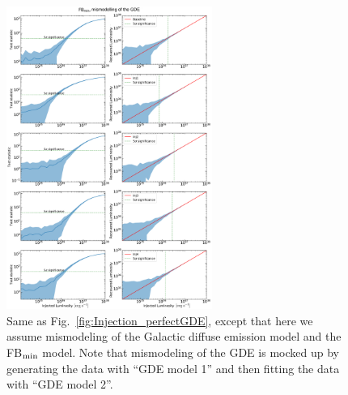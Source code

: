 \documentclass[doublespace,nopageskip]{VTthesis}
\begin{document}
\begin{figure}
    \begin{center}
    \includegraphics[width=0.6\textwidth]{Figures/CTA/all-TS-mis-True-Fermi-min-True.pdf}
    \caption{Same as Fig.~\ref{fig:Injection_perfectGDE}, except that here we assume mismodeling of the Galactic diffuse emission model and the FB$_{\rm min}$ model. Note that mismodeling of the GDE is mocked up by generating the data with ``GDE model 1'' and then fitting the data with ``GDE model 2''. }\label{fig:InjectionmismodelingFBmin}
    \end{center}
\end{figure}
\end{document}
